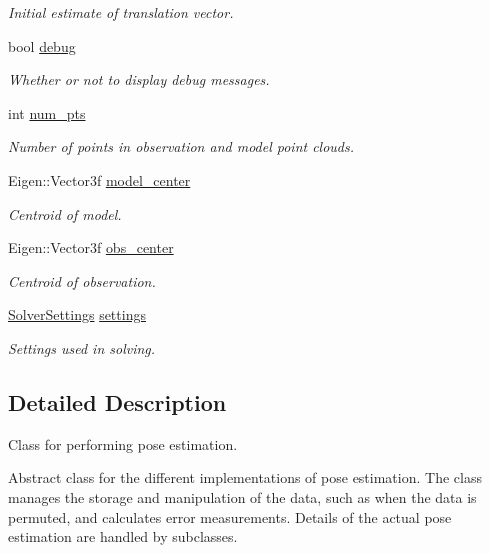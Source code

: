 \begin{DoxyCompactItemize}
\begin{DoxyCompactList}\small\item\em \-Initial estimate of translation vector. \end{DoxyCompactList}\item 
bool \hyperlink{classPoseEstimate_a81f2cf4c423887225557200a6da5744e}{debug}
\begin{DoxyCompactList}\small\item\em \-Whether or not to display debug messages. \end{DoxyCompactList}\item 
int \hyperlink{classPoseEstimate_a8bad9dfcf6b8ec9e3ba4f62498594524}{num\-\_\-pts}
\begin{DoxyCompactList}\small\item\em \-Number of points in observation and model point clouds. \end{DoxyCompactList}\item 
\-Eigen\-::\-Vector3f \hyperlink{classPoseEstimate_acd4fefbc3f3fd794f51a8a338996b2ae}{model\-\_\-center}
\begin{DoxyCompactList}\small\item\em \-Centroid of model. \end{DoxyCompactList}\item 
\-Eigen\-::\-Vector3f \hyperlink{classPoseEstimate_a3431f3d795bc7e5ec3108c923cf4eb9f}{obs\-\_\-center}
\begin{DoxyCompactList}\small\item\em \-Centroid of observation. \end{DoxyCompactList}\item 
\hyperlink{structSolverSettings}{\-Solver\-Settings} \hyperlink{classPoseEstimate_ae1d0b8586991b50d575afa6b8bae92da}{settings}
\begin{DoxyCompactList}\small\item\em \-Settings used in solving. \end{DoxyCompactList}\end{DoxyCompactItemize}


\subsection{\-Detailed \-Description}
\-Class for performing pose estimation. 

\-Abstract class for the different implementations of pose estimation. \-The class manages the storage and manipulation of the data, such as when the data is permuted, and calculates error measurements. \-Details of the actual pose estimation are handled by subclasses.

